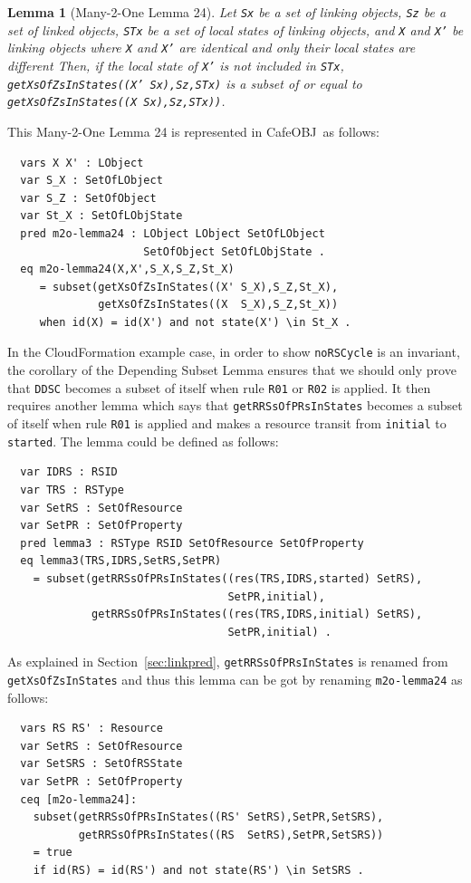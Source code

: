 \documentclass[12pt]{report}
\newtheorem{lemma}{Lemma}
\newcommand{\stt}[1]{{\small{\tt {#1}}}}
\newcommand{\cafeobj}{{\sf CafeOBJ}~}
\begin{document}
\begin{lemma}[Many-2-One Lemma 24]
  Let {\tt Sx} be a set of linking objects, {\tt Sz} be a set of
  linked objects, {\tt STx} be a set of local states of linking
  objects, and {\tt X} and {\tt X'} be linking objects where {\tt X}
  and {\tt X'} are identical and only their local states are different
  Then, if the local state of {\tt X'} is not included in {\tt STx},
  \stt{getXsOfZsInStates((X' Sx),Sz,STx)} is a subset of or equal to
  \stt{getXsOfZsInStates((X Sx),Sz,STx))}.
\end{lemma}
This Many-2-One Lemma 24 is represented in \cafeobj as follows:
\small
\begin{verbatim}
  vars X X' : LObject
  var S_X : SetOfLObject
  var S_Z : SetOfObject
  var St_X : SetOfLObjState
  pred m2o-lemma24 : LObject LObject SetOfLObject
                     SetOfObject SetOfLObjState .
  eq m2o-lemma24(X,X',S_X,S_Z,St_X)
     = subset(getXsOfZsInStates((X' S_X),S_Z,St_X),
              getXsOfZsInStates((X  S_X),S_Z,St_X))
     when id(X) = id(X') and not state(X') \in St_X .
\end{verbatim}
\normalsize
In the CloudFormation example case, in order to show {\tt noRSCycle}
is an invariant, the corollary of the Depending Subset Lemma ensures
that we should only prove that {\tt DDSC} becomes a subset of itself
when rule {\tt R01} or {\tt R02} is applied. It then requires another
lemma which says that {\tt getRRSsOfPRsInStates} becomes a subset of
itself when rule {\tt R01} is applied and makes a resource transit
from {\tt initial} to {\tt started}.  The lemma could be defined as
follows:
\small
\begin{verbatim}
  var IDRS : RSID 
  var TRS : RSType
  var SetRS : SetOfResource
  var SetPR : SetOfProperty
  pred lemma3 : RSType RSID SetOfResource SetOfProperty
  eq lemma3(TRS,IDRS,SetRS,SetPR)
    = subset(getRRSsOfPRsInStates((res(TRS,IDRS,started) SetRS),
                                  SetPR,initial), 
             getRRSsOfPRsInStates((res(TRS,IDRS,initial) SetRS),
                                  SetPR,initial) .
\end{verbatim}
\normalsize
As explained in Section~\ref{sec:linkpred}, {\tt getRRSsOfPRsInStates}
is renamed from {\tt getXsOfZsInStates} and thus this lemma can be got
by renaming {\tt m2o-lemma24} as follows:
\small
\begin{verbatim}
  vars RS RS' : Resource
  var SetRS : SetOfResource
  var SetSRS : SetOfRSState
  var SetPR : SetOfProperty
  ceq [m2o-lemma24]:
    subset(getRRSsOfPRsInStates((RS' SetRS),SetPR,SetSRS),
           getRRSsOfPRsInStates((RS  SetRS),SetPR,SetSRS))
    = true
    if id(RS) = id(RS') and not state(RS') \in SetSRS .
\end{verbatim}
\normalsize
\end{document}
